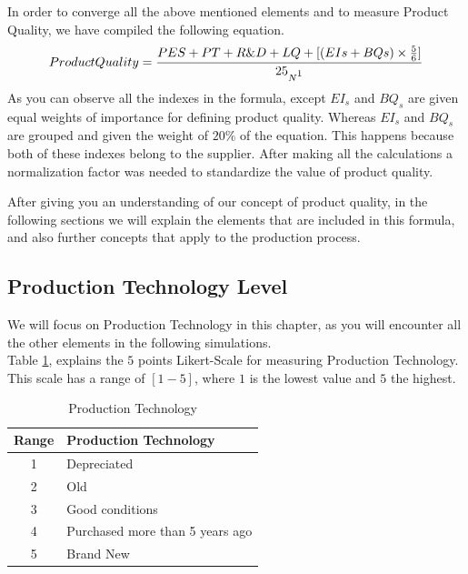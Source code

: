 In order to converge all the above mentioned elements and to measure Product Quality, we have compiled the following equation.
\begin{equation}
ProductQuality = \frac{PES+PT+R\&D+LQ +[(EIs + BQs)\times \frac{5}{6}]}{25_{N\footnotemark}}
\label{eq:PQ}
\end{equation}
As you can observe all the indexes in the formula, except $EI_{s}$ and $BQ_{s}$ are given equal weights of importance for defining product quality. Whereas $EI_{s}$ and $BQ_{s}$ are grouped and given the weight of $20\%$ of the equation. This happens because both of these indexes belong to the supplier. After making all the calculations a normalization factor was needed to standardize the value of product quality. 

After giving you an understanding of our concept of product quality, in the following sections we will explain the elements that  are included in this formula, and also further concepts that apply to the production process.

\subsection{Production Technology Level}
We will focus on Production Technology in this chapter, as you will encounter all the other elements in the following simulations. \\
Table \ref{table:my-label}, explains the $5$ points Likert-Scale for measuring Production Technology. This scale has a range of $[1-5]$, where $1$ is the lowest value and $5$ the highest.

\begin{table}[ht]
\centering
\begin{tabular}{|c|l|}
\hline
 Range & Production Technology\\
\hline
 1 & Depreciated  \\
 2 & Old \\
 3 & Good conditions \\
 4 & Purchased more than 5 years ago  \\
 5 & Brand New\\
\hline
\end{tabular}
\caption{Production Technology}
\label{table:my-label}
\end{table}

